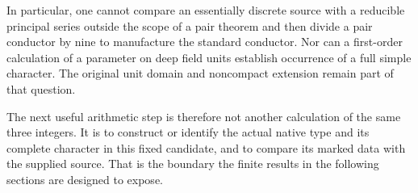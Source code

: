In particular, one cannot compare an essentially discrete source with a reducible principal series outside the scope of a pair theorem and then divide a pair conductor by nine to manufacture the standard conductor. Nor can a first-order calculation of a parameter on deep field units establish occurrence of a full simple character. The original unit domain and noncompact extension remain part of that question.

The next useful arithmetic step is therefore not another calculation of the same three integers. It is to construct or identify the actual native type and its complete character in this fixed candidate, and to compare its marked data with the supplied source. That is the boundary the finite results in the following sections are designed to expose.


